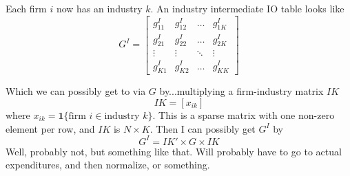 \documentclass[11pt]{article}
\begin{document}
Each firm $i$ now has an industry $k$. An industry intermediate IO table looks like
\[
G^I =
\begin{bmatrix}
    g^I_{11} & g^I_{12} &\dots  & g^I_{1K}  \\
    g^I_{21} & g^I_{22}  &\dots  & g^I_{2K} \\
    \vdots & \vdots & \ddots & \vdots \\
    g^I_{K1} & g^I_{K2} & \dots  &  g^I_{KK}
\end{bmatrix}
\]

Which we can possibly get to via $G$ by...multiplying a firm-industry matrix $IK$
\[
IK = [x_{ik} ]
\]
where $x_{ik} = \mathbf{1} \{ \text{firm } i \in \text{industry } k \}$. This is a sparse matrix with one non-zero element per row, and $IK$ is $N \times K$. Then I can possibly get $G^I$ by
\[
G^I = IK' \times G \times IK
\]
Well, probably not, but something like that. Will probably have to go to actual expenditures, and then normalize, or something.



 






\end{document}
